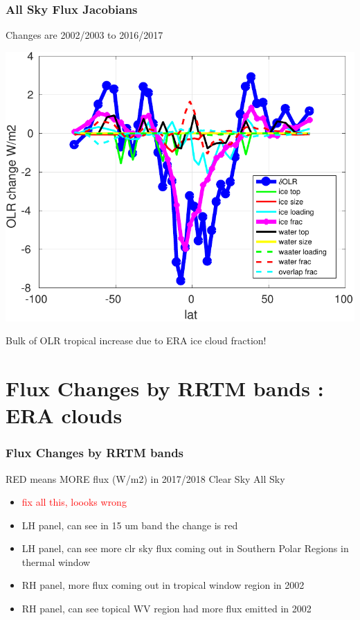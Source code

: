 \documentclass[10pt,t]{beamer}
\begin{document}
\begin{frame}
  \frametitle{All Sky Flux Jacobians}
  Changes are 2002/2003 to 2016/2017  \newline
  \begin{center}
    \noindent\includegraphics[width=0.675\linewidth]{Figs//allsky_cloud_fluxjacs.pdf}
  \end{center}
  Bulk of OLR tropical increase due to ERA ice cloud fraction!
\end{frame}
\section{Flux Changes by RRTM bands : ERA clouds}
\begin{frame}
  \frametitle{Flux Changes by RRTM bands}
  RED means MORE flux (W/m2) in 2017/2018 \newline
  \hspace{0.50in} Clear Sky  \hspace{1.75in} All Sky \\
  \begin{center}
  \end{center}

  \begin{small}
    \begin{itemize}
    \item \textcolor{red}{fix all this, loooks wrong}
    \item LH panel, can see in 15 um band the change is red
    \item LH panel, can see more clr sky flux coming out in Southern Polar Regions in thermal window
    \item RH panel, more flux coming out in tropical window region in 2002
    \item RH panel, can see topical WV region had more flux emitted in 2002
    \end{itemize}
  \end{small}
\end{frame}
\end{document}

